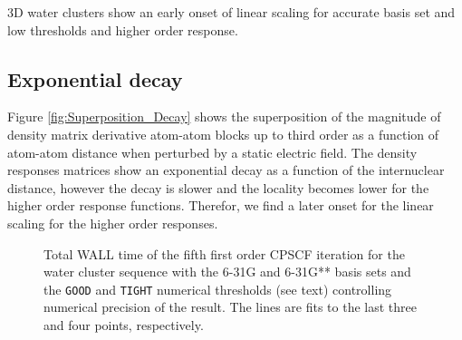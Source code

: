 \documentclass[prl,aps,twocolumn,showpacs,twocolumngrid,superbib]{revtex4}
\begin{document}
3D water clusters show an early onset of linear scaling for accurate
basis set and low thresholds and higher order response.


\subsection{Exponential decay}
Figure \ref{fig:Superposition_Decay} shows the superposition 
of the magnitude of density matrix derivative atom-atom blocks up to 
third order as a function of atom-atom distance when perturbed by 
a static electric field. 
The density responses matrices show an exponential decay as a function
of the internuclear distance, however the decay is slower and the locality
becomes lower for the higher order response functions.
Therefor, we find a later onset for the linear scaling for the higher order
responses. 



\begin{figure}[t]
  \caption{\protect
    Total WALL time of the fifth first order CPSCF iteration for
    the water cluster sequence with the 6-31G and 6-31G** 
    basis sets and the {\tt GOOD} and {\tt TIGHT} 
    numerical thresholds (see text) controlling numerical
    precision of the result. The lines are fits to the 
    last three and four points, respectively.
  }\label{Alpha_scaling}
\end{figure}
\end{document}
